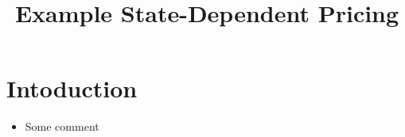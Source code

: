 \documentclass[a4paper,10pt]{article}  %
\title{ Example State-Dependent Pricing \vspace{-5em}} %
\date{ \vspace{-0em} }
\begin{document}
\maketitle

\begin{abstract}

\end{abstract}

\section{Intoduction} %
\label{sec:intoduction}
\begin{itemize}
   
   \item Some comment

\end{itemize}
\end{document}
